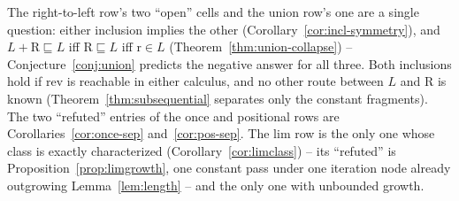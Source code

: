 \documentclass[runningheads,envcountsect]{llncs}
\begin{document}
The right-to-left row's two ``open'' cells and the union row's one are a single question: either inclusion implies the other (Corollary~\ref{cor:incl-symmetry}), and $L{+}\mathrm{R} \sqsubseteq L$ iff $\mathrm{R} \sqsubseteq L$ iff $\mathrm{r} \in L$ (Theorem~\ref{thm:union-collapse}) -- Conjecture~\ref{conj:union} predicts the negative answer for all three. Both inclusions hold if $\mathrm{rev}$ is reachable in either calculus, and no other route between $L$ and $\mathrm{R}$ is known (Theorem~\ref{thm:subsequential} separates only the constant fragments). The two ``refuted'' entries of the once and positional rows are Corollaries~\ref{cor:once-sep} and~\ref{cor:pos-sep}. The $\mathrm{lim}$ row is the only one whose class is exactly characterized (Corollary~\ref{cor:limclass}) -- its ``refuted'' is Proposition~\ref{prop:limgrowth}, one constant pass under one iteration node already outgrowing Lemma~\ref{lem:length} -- and the only one with unbounded growth.
\end{document}
